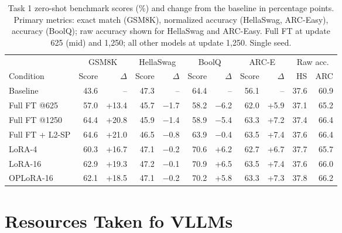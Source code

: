 \documentclass{article}
\begin{document}
\begin{table}[H]
  \centering
  \footnotesize
  \caption{Task 1 zero-shot benchmark scores (\%) and change from the baseline in percentage points. Primary metrics: exact match (GSM8K), normalized accuracy (HellaSwag, ARC-Easy), accuracy (BoolQ); raw accuracy shown for HellaSwag and ARC-Easy. Full FT at update 625 (mid) and 1{,}250; all other models at update 1{,}250. Single seed.}
  \label{tab:t1-bench}
  \begin{tabular}{lrrrrrrrrrr}
    \toprule
    & \multicolumn{2}{c}{GSM8K} & \multicolumn{2}{c}{HellaSwag} & \multicolumn{2}{c}{BoolQ} & \multicolumn{2}{c}{ARC-E} & \multicolumn{2}{c}{Raw acc.} \\
    \cmidrule(lr){2-3}\cmidrule(lr){4-5}\cmidrule(lr){6-7}\cmidrule(lr){8-9}\cmidrule(lr){10-11}
    Condition & Score & $\Delta$ & Score & $\Delta$ & Score & $\Delta$ & Score & $\Delta$ & HS & ARC \\
    \midrule
    Baseline & 43.6 & -- & 47.3 & -- & 64.4 & -- & 56.1 & -- & 37.6 & 60.9 \\
    \midrule
    Full FT @625 & 57.0 & +13.4 & 45.7 & $-$1.7 & 58.2 & $-$6.2 & 62.0 & +5.9 & 37.1 & 65.2 \\
    Full FT @1250 & 64.4 & +20.8 & 45.9 & $-$1.4 & 58.9 & $-$5.4 & 63.3 & +7.2 & 37.4 & 66.4 \\
    Full FT + L2-SP & 64.6 & +21.0 & 46.5 & $-$0.8 & 63.9 & $-$0.4 & 63.5 & +7.4 & 37.6 & 66.4 \\
    LoRA-4 & 60.3 & +16.7 & 47.1 & $-$0.2 & 70.6 & +6.2 & 62.7 & +6.7 & 37.7 & 65.7 \\
    LoRA-16 & 62.9 & +19.3 & 47.2 & $-$0.1 & 70.9 & +6.5 & 63.5 & +7.4 & 37.6 & 66.0 \\
    OPLoRA-16 & 62.1 & +18.5 & 47.1 & $-$0.2 & 70.2 & +5.8 & 63.3 & +7.3 & 37.8 & 66.2 \\
    \bottomrule
  \end{tabular}
\end{table}

\section{Resources Taken fo VLLMs}
\end{document}
